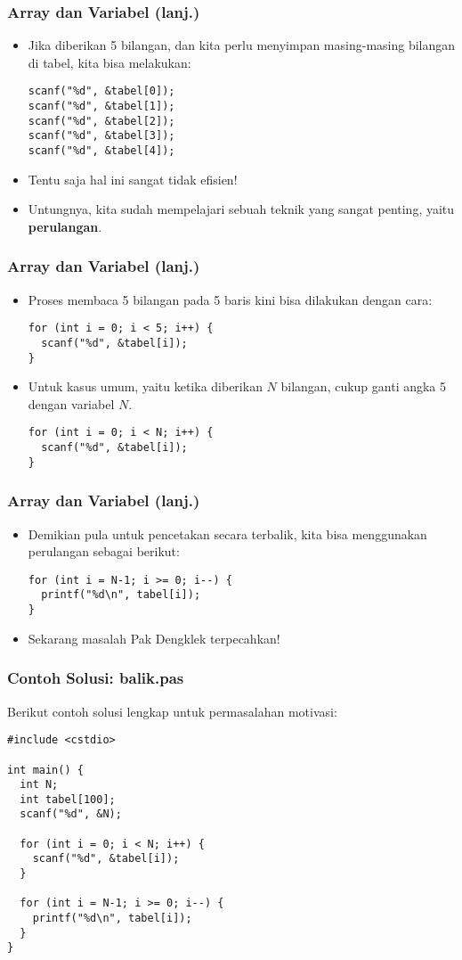 \begin{frame}[fragile]
\frametitle{Array dan Variabel (lanj.)}
\begin{itemize}
  \item Jika diberikan 5 bilangan, dan kita perlu menyimpan masing-masing bilangan di tabel, kita bisa melakukan:
\begin{lstlisting}
scanf("%d", &tabel[0]);
scanf("%d", &tabel[1]);
scanf("%d", &tabel[2]);
scanf("%d", &tabel[3]);
scanf("%d", &tabel[4]);
\end{lstlisting}
  \item Tentu saja hal ini sangat tidak efisien!
  \item Untungnya, kita sudah mempelajari sebuah teknik yang sangat penting, yaitu \textbf{perulangan}.
\end{itemize}
\end{frame}

\begin{frame}[fragile]
\frametitle{Array dan Variabel (lanj.)}
\begin{itemize}
  \item Proses membaca 5 bilangan pada 5 baris kini bisa dilakukan dengan cara:
\begin{lstlisting}
for (int i = 0; i < 5; i++) {
  scanf("%d", &tabel[i]);
}
\end{lstlisting}
  \item Untuk kasus umum, yaitu ketika diberikan $N$ bilangan, cukup ganti angka 5 dengan variabel $N$.
\begin{lstlisting}
for (int i = 0; i < N; i++) {
  scanf("%d", &tabel[i]);
}
\end{lstlisting}
\end{itemize}
\end{frame}

\begin{frame}[fragile]
\frametitle{Array dan Variabel (lanj.)}
\begin{itemize}
  \item Demikian pula untuk pencetakan secara terbalik, kita bisa menggunakan perulangan sebagai berikut:
\begin{lstlisting}
for (int i = N-1; i >= 0; i--) {
  printf("%d\n", tabel[i]);
}
\end{lstlisting}
  \item Sekarang masalah Pak Dengklek terpecahkan!
\end{itemize}
\end{frame}

\begin{frame}[fragile]
\frametitle{Contoh Solusi: balik.pas}
Berikut contoh solusi lengkap untuk permasalahan motivasi:
\begin{lstlisting}
#include <cstdio>

int main() {
  int N;
  int tabel[100];
  scanf("%d", &N);

  for (int i = 0; i < N; i++) {
    scanf("%d", &tabel[i]);
  }

  for (int i = N-1; i >= 0; i--) {
    printf("%d\n", tabel[i]);
  }
}
\end{lstlisting}
\end{frame}



